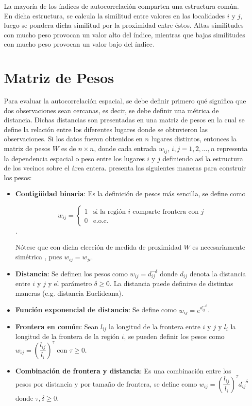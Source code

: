 La mayoría de los índices de autocorrelación comparten una estructura común. En dicha estructura, se calcula la similitud entre valores en las localidades $i$ y $j$, luego se pondera dicha similitud por la proximidad entre éstos. Altas similitudes con mucho peso provocan un valor alto del índice, mientras que bajas similitudes con mucho peso provocan un valor bajo del índice.

\section{Matriz de Pesos}
Para evaluar la autocorrelación espacial, se debe definir primero qué significa que dos observaciones sean cercanas, es decir, se debe definir una métrica de distancia. Dichas distancias son presentadas en una matriz de pesos en la cual se define la relación entre los diferentes lugares donde se obtuvieron las observaciones. Si los datos fueron obtenidos en $n$ lugares distintos, entonces la matriz de pesos $W$ es de $n \times n$, donde cada entrada $w_{ij}$, $i,j=1, 2, \dots, n$ representa la dependencia espacial o peso entre los lugares $i$ y $j$ definiendo así la estructura de los vecinos sobre el área entera. \citet{haining} presenta las siguientes maneras para construir los pesos:

\begin{itemize}
\item  \textbf{Contigüidad binaria}: Es la definición de pesos más sencilla, se define como 

\begin{equation} \label{binw}
w_{ij}=  \begin{cases} 1 & \mbox{si la región } i \mbox{ comparte frontera con } j \\ 
0 & \mbox{e.o.c.} 
\end{cases}
\end{equation}.

Nótese que con dicha elección de medida de proximidad $W$ es necesariamente simétrica , pues $w_{ij}=w_{ji}$.


\item \textbf{Distancia}: Se definen los pesos como $w_{ij}=d_{ij}^{-\delta}$ donde $d_{ij}$ denota la distancia entre $i$ y $j$ y el parámetro $\delta \geq 0$. La distancia puede definirse de distintas maneras (e.g. distancia Euclideana).

\item \textbf{Función exponencial de distancia}: Se define como $w_{ij}=e^{d_{ij}^{-\delta}}$.

\item \textbf{Frontera en común}: Sean $l_{ij}$ la longitud de la frontera entre $i$ y $j$ y $l_i$ la longitud de la frontera de la región $i$, se pueden definir los pesos como $w_{ij}=\left( \dfrac{l_{ij}}{l_i}\right)^{\tau}$ con $\tau \geq 0$.

\item \textbf{Combinación de frontera y distancia}: Es una combinación entre los pesos por distancia y por tamaño de frontera, se define como $w_{ij}=\left( \dfrac{l_{ij}}{l_i}\right)^{\tau}d_{ij}^{-\delta}$ donde $\tau, \delta \geq 0$.
\end{itemize}

